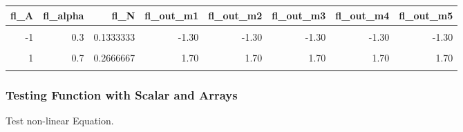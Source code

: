 \documentclass[
]{book}
\begin{document}
\begin{table}[!h]
\centering
\begin{tabular}{r|r|r|r|r|r|r|r}
\hline
fl\_A & fl\_alpha & fl\_N & fl\_out\_m1 & fl\_out\_m2 & fl\_out\_m3 & fl\_out\_m4 & fl\_out\_m5\\
\hline
\cellcolor{gray!6}{-2} & \cellcolor{gray!6}{0.1} & \cellcolor{gray!6}{0.0666667} & \cellcolor{gray!6}{-0.55} & \cellcolor{gray!6}{-0.55} & \cellcolor{gray!6}{-0.55} & \cellcolor{gray!6}{-0.55} & \cellcolor{gray!6}{-0.55}\\
\hline
-1 & 0.3 & 0.1333333 & -1.30 & -1.30 & -1.30 & -1.30 & -1.30\\
\hline
\cellcolor{gray!6}{0} & \cellcolor{gray!6}{0.5} & \cellcolor{gray!6}{0.2000000} & \cellcolor{gray!6}{NaN} & \cellcolor{gray!6}{NaN} & \cellcolor{gray!6}{NaN} & \cellcolor{gray!6}{NaN} & \cellcolor{gray!6}{NaN}\\
\hline
1 & 0.7 & 0.2666667 & 1.70 & 1.70 & 1.70 & 1.70 & 1.70\\
\hline
\cellcolor{gray!6}{2} & \cellcolor{gray!6}{0.9} & \cellcolor{gray!6}{0.3333333} & \cellcolor{gray!6}{0.95} & \cellcolor{gray!6}{0.95} & \cellcolor{gray!6}{0.95} & \cellcolor{gray!6}{0.95} & \cellcolor{gray!6}{0.95}\\
\hline
\end{tabular}
\end{table}

\hypertarget{testing-function-with-scalar-and-arrays}{%
\subsubsection{Testing Function with Scalar and Arrays}\label{testing-function-with-scalar-and-arrays}}

Test non-linear Equation.
\end{document}
